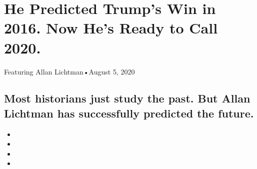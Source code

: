 \hypertarget{he-predicted-trumps-win-in-2016-now-hes-ready-to-call-2020-1}{%
\section{He Predicted Trump's Win in 2016. Now He's Ready to Call
2020.}\label{he-predicted-trumps-win-in-2016-now-hes-ready-to-call-2020-1}}

Featuring Allan Lichtman•August 5, 2020

\hypertarget{most-historians-just-study-the-past-but-allan-lichtman-has-successfully-predicted-the-future-1}{%
\subsection{Most historians just study the past. But Allan Lichtman has
successfully predicted the
future.}\label{most-historians-just-study-the-past-but-allan-lichtman-has-successfully-predicted-the-future-1}}

\begin{itemize}
\item
\item
\item
\item
\end{itemize}

